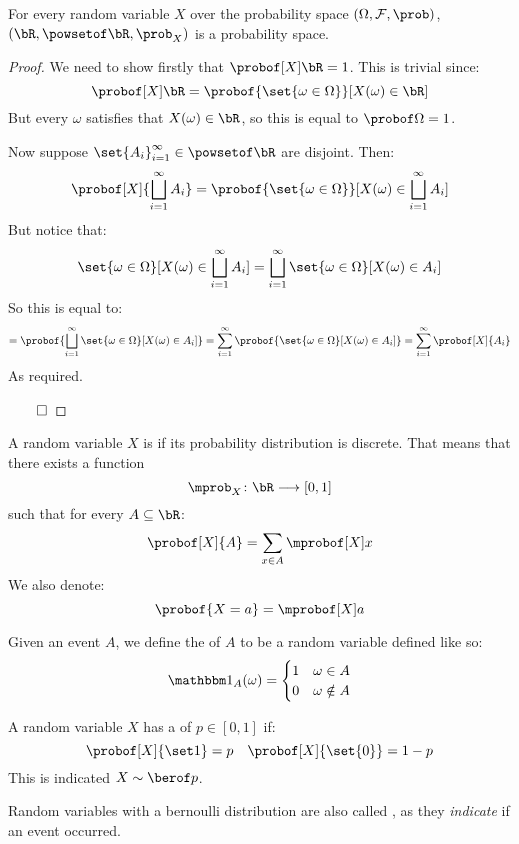 \begin{prop*}

	For every random variable $X$ over the probability space $(\Omega,\cF,\prob)$, $(\bR,\powsetof\bR,\prob_X)$ is a
	probability space.

\end{prop*}

\begin{proof}

	We need to show firstly that $\probof[X]\bR=1$.
	This is trivial since:
	\[ \probof[X]\bR = \probof{\set{\omega\in\Omega}}[X(\omega)\in\bR] \]
	But every $\omega$ satisfies that $X(\omega)\in\bR$, so this is equal to $\probof\Omega=1$.

	Now suppose $\set{A_i}_{i=1}^\infty\in\powsetof\bR$ are disjoint.
	Then:
	\[ \probof[X]{\bigsqcup_{i=1}^\infty A_i} = \probof{\set{\omega\in\Omega}}[X(\omega)\in\bigsqcup_{i=1}^\infty A_i] \]
	But notice that:
	\[ \set{\omega\in\Omega}[X(\omega)\in\bigsqcup_{i=1}^\infty A_i] =
	   \bigsqcup_{i=1}^\infty\set{\omega\in\Omega}[X(\omega)\in A_i] \]
	So this is equal to:
	\[ = \probof{\bigsqcup_{i=1}^\infty\set{\omega\in\Omega}[X(\omega)\in A_i]} =
		 \sum_{i=1}^\infty\probof{\set{\omega\in\Omega}[X(\omega)\in A_i]} = \sum_{i=1}^\infty\probof[X]{A_i} \]
	As required.

\hfill$\qed$

\end{proof}

\begin{defn*}

	A random variable $X$ is  if its probability distribution is discrete.
	That means that there exists a function
	\[ \mprob_X\colon\bR\longrightarrow[0,1] \]
	such that for every $A\subseteq\bR$:
	\[ \probof[X]{A} = \sum_{x\in A}\mprobof[X]x \]
	We also denote:
	\[ \probof{X=a}=\mprobof[X]a \]

\end{defn*}

\begin{defn*}

	Given an event $A$, we define the  of $A$ to be a random variable defined like so:
	\[ \bone_A(\omega) = \begin{cases} 1 & \omega\in A \\ 0 & \omega\notin A \end{cases} \]

\end{defn*}

\begin{defn*}

	A random variable $X$ has a  of $p\in[0,1]$ if:
	\[ \probof[X]{\set1}=p \quad \probof[X]{\set{0}} = 1-p \]
	This is indicated $X\sim\berof p$.

	Random variables with a bernoulli distribution are also called , as they {\sl indicate} if an event
	occurred.

\end{defn*}

